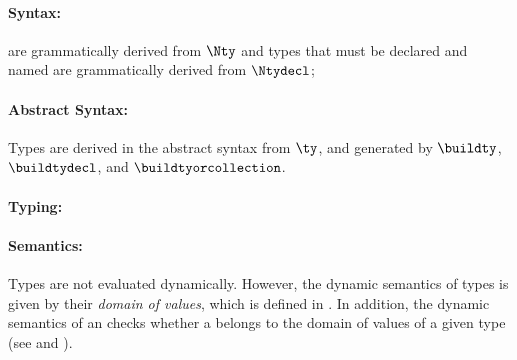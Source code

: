 \paragraph{Syntax:} \Anonymoustypes{} are grammatically derived from $\Nty$
and types that must be declared and named are grammatically derived from $\Ntydecl$;

\paragraph{Abstract Syntax:} Types are derived in the abstract syntax from $\ty$,
  and generated by $\buildty$, $\buildtydecl$, and $\buildtyorcollection$.

\paragraph{Typing:}

\paragraph{Semantics:} Types are not evaluated dynamically.
  However, the dynamic semantics of types is given by their \emph{domain of values},
  which is defined in .
  In addition, the dynamic semantics of an \atcexpressionterm{}
  checks whether a \nativevalueterm{} belongs to the domain of values of a given type
  (see  and ).




